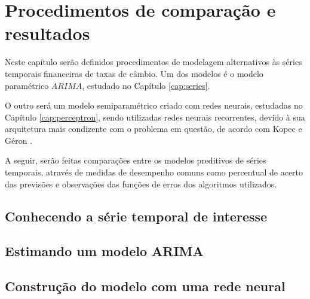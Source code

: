 
\chapter{Procedimentos de comparação e resultados}
\label{cap:comparacao}

Neste capítulo serão definidos procedimentos de modelagem alternativos às séries temporais financeiras de taxas de câmbio. Um dos modelos é o modelo paramétrico $ARIMA$, estudado no Capítulo \ref{cap:series}. 

O outro será um modelo semiparamétrico criado com redes neurais, estudadas no Capítulo \ref{cap:perceptron}, sendo utilizadas redes neurais recorrentes, devido à sua arquitetura mais condizente com o problema em questão, de acordo com Kopec \citep{classic} e Géron \citep{hands}.

A seguir, serão feitas comparações entre os modelos preditivos de séries temporais, através de medidas de desempenho comuns como percentual de acerto das previsões e observações das funções de erros dos algoritmos utilizados.

\section{Conhecendo a série temporal de interesse}

\section{Estimando um modelo ARIMA}

\section{Construção do modelo com uma rede neural}